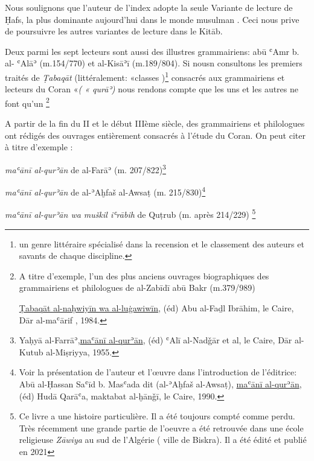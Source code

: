 \documentclass[a4paper,12pt]{report}
\begin{document}
\begin{itemize}
{Nous soulignons que l'auteur de l'index adopte la seule Variante de lecture de Ḥafs, la plus dominante aujourd'hui dans le monde musulman . Ceci nous prive de poursuivre les autres variantes de lecture  dans le  Kitāb. } 

\hspace*{1cm}  Deux parmi les sept lecteurs sont aussi des illustres grammairiens:    abū ʿAmr b. al- ʿAlāʾ (m.154/770) et al-Kisāʾī (m.189/804). Si nousn consultons les premiers  traités de \textit{ Ṭabaqāt }  (littéralement: «classes )\footnote{un genre littéraire spécialisé dans la recension et le classement des auteurs et savants de chaque discipline.  } consacrés aux grammairiens et lecteurs du Coran   «\textit{( « qurāʾ)}  nous rendons compte que les uns et les autres ne font qu'un \footnote{ A titre d'exemple, l'un des plus anciens ouvrages biographiques des grammairiens et philologues  de	al-Zabīdī abū Bakr (m.379/989) 

\underline {Ṭabaqāt al-naḥwiyīn wa al-luġawiwīn}, (éd) Abu al-Faḏl Ibrāhim,  le Caire, Dār al-maʿārif , 1984.} 
 
  

\hspace*{1cm} A partir de la fin du II et le début IIIème siècle, des grammairiens et philologues ont rédigés  des ouvrages entièrement consacrés à l'étude du Coran. On peut citer à titre d'exemple :  


    \hspace*{2cm}  \textit{maʿānī al-qurʾān}  de al-Far\=aʾ (m. 207/822)\footnote {Yaḥyā al-Farr\=aʾ,\underline {maʿānī al-qurʾān}, (éd) ʿAlī al-Nadǧār et al,  le Caire, Dār al-Kutub al-Miṣriyya, 1955.}

     \hspace*{2cm}  \textit{maʿānī al-qurʾān}  de al-ʾAḫfaš al-Awsaṭ (m. 215/830)\footnote { Voir la présentation de l'auteur et l'œuvre dans l'introduction de l'éditrice:   Abū al-Ḥassan  Saʿīd b. Masʿada   dit (al-ʾAḫfaš al-Awsaṭ), \underline{maʿānī al-qurʾān}, (éd) Hudā Qarāʿa, maktabat al-ḫānǧī, le Caire, 1990.} 

\hspace*{2cm}  \textit{maʿānī al-qurʾān wa muškil iʿrābih} de Quṭrub (m. après 214/229) \footnote {Ce livre a une histoire particulière. Il a été toujours compté comme perdu. Très récemment une grande partie de l'oeuvre  a été retrouvée dans une école religieuse \textit{Z\=awiya} au sud de l'Algérie ( ville de Biskra). Il a été édité et publié en 2021 

}
\end{itemize}
\end{document}
